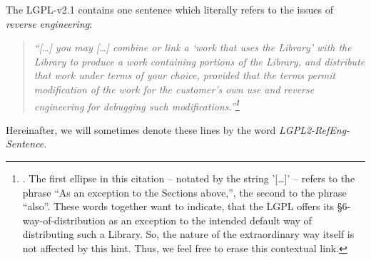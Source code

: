 %
%
%
%
%



The LGPL-v2.1 contains one sentence which literally refers to the issues of
\emph{reverse engineering}:

\begin{quote}\noindent\emph{\enquote{[\ldots] you may [\ldots] combine or link a
\enquote{work that uses the Library} with the Library to produce a work
containing portions of the Library, and distribute that work under terms of your
choice, provided that the terms permit modification of the work for the
customer's own use and \emph{reverse engineering} for debugging such
modifications.}\footnote{\cite[cf.][\nopage wp., §6. ]{Lgpl21OsiLicense1999a}.
The first ellipse in this citation -- notated by the string '[\ldots]' -- refers
to the phrase \enquote{As an exception to the Sections above,}, the second to
the phrase \enquote{also}. These words together want to indicate, that the LGPL
offers its §6-way-of-distribution as an exception to the intended default way of
distributing such a Library. So, the nature of the extraordinary way itself is
not affected by this hint. Thus, we feel free to erase this contextual
link.}}\end{quote}

Hereinafter, we will sometimes denote these lines by
the word \emph{LGPL2-RefEng-Sentence}.
